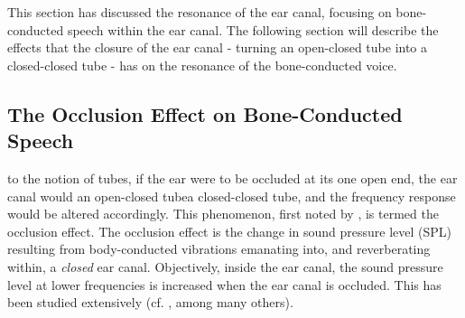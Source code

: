 This section has discussed the resonance of the ear canal, focusing on bone-conducted speech within the ear canal.  The following section will describe the effects that the closure of the ear canal - turning an open-closed tube into a closed-closed tube - has on the resonance of the bone-conducted voice.


\subsection{The Occlusion Effect on Bone-Conducted Speech}\label{sec:OEBCspeech}



\DIFdelbegin {}\DIFdelend \DIFaddbegin {}\DIFaddend to the notion of tubes, if the ear were to be occluded at its one open end, the ear canal would \DIFdelbegin {}\DIFdelend \DIFaddbegin {}\DIFaddend an open-closed tube\DIFdelbegin {}\DIFdelend \DIFaddbegin {}\DIFaddend a closed-closed tube, and the frequency response would be altered accordingly.  This phenomenon, first noted by \cite{wheatstone:79}, is termed the occlusion effect\DIFdelbegin {}\DIFdelend .  The occlusion effect \DIFdelbegin {}\DIFdelend is the change in sound pressure level (SPL) resulting from body-conducted vibrations emanating into, and reverberating within, a \textit{closed} ear canal.  Objectively, inside the ear canal, the sound pressure level at lower frequencies is increased when the ear canal is occluded.  This has been studied extensively (cf. \cite{wheatstone:79,kelly:37,littler:52,tonndorf:66}, among many others).  %

